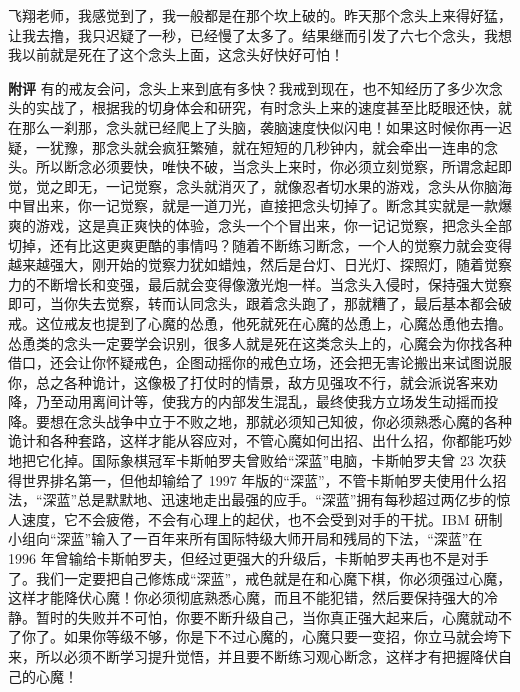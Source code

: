 \begin{case}
    飞翔老师，我感觉到了，我一般都是在那个坎上破的。昨天那个念头上来得好猛，让我去撸，我只迟疑了一秒，已经慢了太多了。结果继而引发了六七个念头，我想我以前就是死在了这个念头上面，这念头好快好可怕！

    \textbf{附评} 有的戒友会问，念头上来到底有多快？我戒到现在，也不知经历了多少次念头的实战了，根据我的切身体会和研究，有时念头上来的速度甚至比眨眼还快，就在那么一刹那，念头就已经爬上了头脑，袭脑速度快似闪电！如果这时候你再一迟疑，一犹豫，那念头就会疯狂繁殖，就在短短的几秒钟内，就会牵出一连串的念头。所以断念必须要快，唯快不破，当念头上来时，你必须立刻觉察，所谓念起即觉，觉之即无，一记觉察，念头就消灭了，就像忍者切水果的游戏，念头从你脑海中冒出来，你一记觉察，就是一道刀光，直接把念头切掉了。断念其实就是一款爆爽的游戏，这是真正爽快的体验，念头一个个冒出来，你一记记觉察，把念头全部切掉，还有比这更爽更酷的事情吗？随着不断练习断念，一个人的觉察力就会变得越来越强大，刚开始的觉察力犹如蜡烛，然后是台灯、日光灯、探照灯，随着觉察力的不断增长和变强，最后就会变得像激光炮一样。当念头入侵时，保持强大觉察即可，当你失去觉察，转而认同念头，跟着念头跑了，那就糟了，最后基本都会破戒。这位戒友也提到了心魔的怂恿，他死就死在心魔的怂恿上，心魔怂恿他去撸。怂恿类的念头一定要学会识别，很多人就是死在这类念头上的，心魔会为你找各种借口，还会让你怀疑戒色，企图动摇你的戒色立场，还会把无害论搬出来试图说服你，总之各种诡计，这像极了打仗时的情景，敌方见强攻不行，就会派说客来劝降，乃至动用离间计等，使我方的内部发生混乱，最终使我方立场发生动摇而投降。要想在念头战争中立于不败之地，那就必须知己知彼，你必须熟悉心魔的各种诡计和各种套路，这样才能从容应对，不管心魔如何出招、出什么招，你都能巧妙地把它化掉。国际象棋冠军卡斯帕罗夫曾败给“深蓝”电脑，卡斯帕罗夫曾 23 次获得世界排名第一，但他却输给了 1997 年版的“深蓝”，不管卡斯帕罗夫使用什么招法，“深蓝”总是默默地、迅速地走出最强的应手。“深蓝”拥有每秒超过两亿步的惊人速度，它不会疲倦，不会有心理上的起伏，也不会受到对手的干扰。IBM 研制小组向“深蓝”输入了一百年来所有国际特级大师开局和残局的下法，“深蓝”在 1996 年曾输给卡斯帕罗夫，但经过更强大的升级后，卡斯帕罗夫再也不是对手了。我们一定要把自己修炼成“深蓝”，戒色就是在和心魔下棋，你必须强过心魔，这样才能降伏心魔！你必须彻底熟悉心魔，而且不能犯错，然后要保持强大的冷静。暂时的失败并不可怕，你要不断升级自己，当你真正强大起来后，心魔就动不了你了。如果你等级不够，你是下不过心魔的，心魔只要一变招，你立马就会垮下来，所以必须不断学习提升觉悟，并且要不断练习观心断念，这样才有把握降伏自己的心魔！
\end{case}

